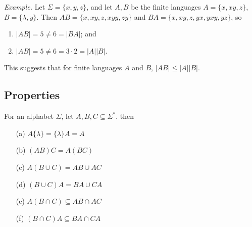 \documentclass[11pt]{article}
\begin{document}
    \vspace{1em}

    \emph{Example.} Let \(\Sigma = \{x,y,z\}\), and let \(A,B\) be the finite languages \(A = \{x, xy, z\}\), \(B = \{\lambda, y\}\). Then \(AB = \{x, xy, z, xyy, zy\}\) and \(BA = \{x, xy, z, yx, yxy, yz\}\), so 
    \begin{enumerate}
        \item \(|AB| = 5 \neq 6 = |BA|\); and
        \item \(|AB| = 5 \neq 6 = 3 \cdot 2 = |A||B|\).
    \end{enumerate}

    This suggests that for finite languages $A$ and $B$, \(|AB| \leq |A||B|\).

    \subsection{Properties}

    For an alphabet \(\Sigma\), let \(A,B,C \subseteq \Sigma^*\). then
    \begin{enumerate}
        \item[(a)] \(A \{\lambda\} = \{\lambda\} A = A\)
        \item[(b)] \((AB)C = A(BC)\)
        \item[(c)] \(A(B \cup C) = AB \cup AC\)
        \item[(d)] \((B \cup C)A = BA \cup CA\)
        \item[(e)] \(A(B \cap C) \subseteq AB \cap AC\)
        \item[(f)] \((B \cap C)A \subseteq BA \cap CA\)      
    \end{enumerate}
\end{document}
